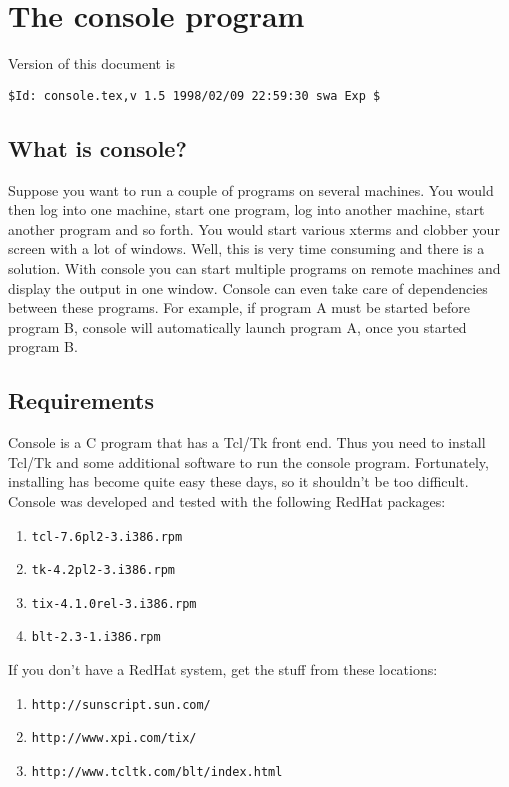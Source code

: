 \documentclass{article}
\begin{document}
\section{The console program}

Version of this document is
\begin{verbatim}
$Id: console.tex,v 1.5 1998/02/09 22:59:30 swa Exp $
\end{verbatim}

\subsection{What is console?}

Suppose you want to run a couple of programs on several machines. You would
then log into one machine, start one program, log into another machine, start
another program and so forth. You would start various xterms and clobber your
screen with a lot of windows. Well, this is very time consuming and there is a
solution. With console you can start multiple programs on remote machines and
display the output in one window. Console can even take care of dependencies
between these programs. For example, if program A must be started before
program B, console will automatically launch program A, once you started
program B.

\subsection{Requirements}

Console is a C program that has a Tcl/Tk front end. Thus you need to install
Tcl/Tk and some additional software to run the console program. Fortunately,
installing has become quite easy these days, so it shouldn't be too difficult.
Console was developed and tested with the following RedHat packages:

\begin{enumerate}
\item \texttt{tcl-7.6pl2-3.i386.rpm}
\item \texttt{tk-4.2pl2-3.i386.rpm}
\item \texttt{tix-4.1.0rel-3.i386.rpm}
\item \texttt{blt-2.3-1.i386.rpm}
\end{enumerate}

If you don't have a RedHat system, get the stuff from these locations:

\begin{enumerate}
\item \texttt{http://sunscript.sun.com/}
\item \texttt{http://www.xpi.com/tix/}
\item \texttt{http://www.tcltk.com/blt/index.html}
\end{enumerate}
\end{document}
